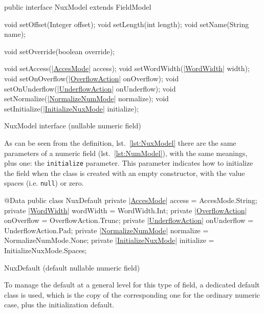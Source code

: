\begin{elisting}[!htb]
\begin{javacode}
public interface NuxModel extends FieldModel {
    void setOffset(Integer offset);
    void setLength(int length);
    void setName(String name);

    void setOverride(boolean override);

    void setAccess(|\hyperref[lst:AccesMode]{AccesMode}| access);
    void setWordWidth(|\hyperref[lst:WordWidth]{WordWidth}| width);
    void setOnOverflow(|\hyperref[lst:OverflowAction]{OverflowAction}| onOverflow);
    void setOnUnderflow(|\hyperref[lst:UnderflowAction]{UnderflowAction}| onUnderflow);
    void setNormalize(|\hyperref[lst:NormalizeNumMode]{NormalizeNumMode}| normalize);
    void setInitialize(|\hyperref[lst:InitializeNuxMode]{InitializeNuxMode}| initialize);
}
\end{javacode}
\caption{NuxModel interface (nullable numeric field)}
\label{lst:NuxModel}
\end{elisting}

As can be seen from the definition, lst.~\ref{lst:NuxModel} there are the same 
parameters of a numeric field (lst.~\ref{lst:NumModel}), with the same meanings, 
plus one: the \verb!initialize! parameter. 
This parameter indicates how to initialize the field when the class is created 
with an empty constructor, with the value spaces (i.e. \verb!null!) or zero.

\begin{elisting}[!htb]
\begin{javacode}
@Data
public class NuxDefault {
    private |\hyperref[lst:AccesMode]{AccesMode}| access = AccesMode.String;
    private |\hyperref[lst:WordWidth]{WordWidth}| wordWidth = WordWidth.Int;
    private |\hyperref[lst:OverflowAction]{OverflowAction}| onOverflow = OverflowAction.Trunc;
    private |\hyperref[lst:UnderflowAction]{UnderflowAction}| onUnderflow = UnderflowAction.Pad;
    private |\hyperref[lst:NormalizeNumMode]{NormalizeNumMode}| normalize = NormalizeNumMode.None;
    private |\hyperref[lst:InitializeNuxMode]{InitializeNuxMode}| initialize = InitializeNuxMode.Spaces;
}
\end{javacode}
\caption{NuxDefault (default nullable numeric field)}
\label{lst:NuxDefault}
\end{elisting}

To manage the default at a general level for this type of field, a dedicated 
default class is used, which is the copy of the corresponding one for the 
ordinary numeric case, plus the initialization default.

